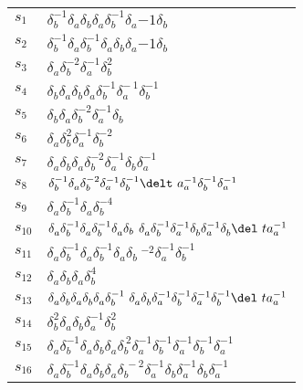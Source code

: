 \documentclass{article}
\begin{document}
\begin{center}
\begin{tabular}{ll}
\midrule
$s_{1}$ & $\delta_b^{-1}\delta_a^{}\delta_b^{}\delta_a^{}\delta_b^{-1}\delta_a^\
{-1}\delta_b^{}$ \\
$s_{2}$ & $\delta_b^{-1}\delta_a^{}\delta_b^{-1}\delta_a^{}\delta_b^{}\delta_a^\
{-1}\delta_b^{}$ \\
$s_{3}$ & $\delta_a^{}\delta_b^{-2}\delta_a^{-1}\delta_b^{2}$ \\
$s_{4}$ & $\delta_b^{}\delta_a^{}\delta_b^{}\delta_a^{}\delta_b^{-1}\delta_a^{-\
1}\delta_b^{-1}$ \\
$s_{5}$ & $\delta_b^{}\delta_a^{}\delta_b^{-2}\delta_a^{-1}\delta_b^{}$ \\
$s_{6}$ & $\delta_a^{}\delta_b^{2}\delta_a^{-1}\delta_b^{-2}$ \\
$s_{7}$ & $\delta_a^{}\delta_b^{}\delta_a^{}\delta_b^{-2}\delta_a^{-1}\delta_b^\
{}\delta_a^{-1}$ \\
$s_{8}$ & $\delta_b^{-1}\delta_a^{}\delta_b^{-2}\delta_a^{-1}\delta_b^{-1}\delt\
a_a^{-1}\delta_b^{-1}\delta_a^{-1}$ \\
$s_{9}$ & $\delta_a^{}\delta_b^{-1}\delta_a^{}\delta_b^{-4}$ \\
$s_{10}$ & $\delta_a^{}\delta_b^{-1}\delta_a^{}\delta_b^{-1}\delta_a^{}\delta_b\
^{}\delta_a^{}\delta_b^{-1}\delta_a^{-1}\delta_b^{}\delta_a^{-1}\delta_b^{}\del\
ta_a^{-1}$ \\
$s_{11}$ & $\delta_a^{}\delta_b^{-1}\delta_a^{}\delta_b^{-1}\delta_a^{}\delta_b\
^{-2}\delta_a^{-1}\delta_b^{-1}$ \\
$s_{12}$ & $\delta_a^{}\delta_b^{}\delta_a^{}\delta_b^{4}$ \\
$s_{13}$ & $\delta_a^{}\delta_b^{}\delta_a^{}\delta_b^{}\delta_a^{}\delta_b^{-1\
}\delta_a^{}\delta_b^{}\delta_a^{-1}\delta_b^{-1}\delta_a^{-1}\delta_b^{-1}\del\
ta_a^{-1}$ \\
$s_{14}$ & $\delta_b^{2}\delta_a^{}\delta_b^{}\delta_a^{-1}\delta_b^{2}$ \\
$s_{15}$ & $\delta_a^{}\delta_b^{-1}\delta_a^{}\delta_b^{}\delta_a^{}\delta_b^{\
2}\delta_a^{-1}\delta_b^{-1}\delta_a^{-1}\delta_b^{-1}\delta_a^{-1}$ \\
$s_{16}$ & $\delta_a^{}\delta_b^{-1}\delta_a^{}\delta_b^{}\delta_a^{}\delta_b^{\
-2}\delta_a^{-1}\delta_b^{}\delta_a^{-1}\delta_b^{}\delta_a^{-1}$ \\
\bottomrule
\end{tabular}
\end{center}

\thispagestyle{empty}
\end{document}
